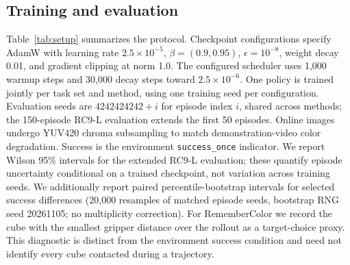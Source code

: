 \documentclass{IJCAS}
\begin{document}
\subsection{Training and evaluation}
\begin{table}[!t]
\caption{Protocol for the main Long-task experiments. Short-task differences are specified in their table captions.}
\label{tab:setup}
\begin{center}
{\footnotesize
{}
}
\end{center}
\end{table}
Table~\ref{tab:setup} summarizes the protocol. Checkpoint configurations specify AdamW with learning rate $2.5\times10^{-5}$, $\beta=(0.9,0.95)$, $\epsilon=10^{-8}$, weight decay 0.01, and gradient clipping at norm 1.0. The configured scheduler uses 1,000 warmup steps and 30,000 decay steps toward $2.5\times10^{-6}$. One policy is trained jointly per task set and method, using one training seed per configuration. Evaluation seeds are $4242424242+i$ for episode index $i$, shared across methods; the 150-episode RC9-L evaluation extends the first 50 episodes. Online images undergo YUV420 chroma subsampling to match demonstration-video color degradation. Success is the environment \texttt{success\_once} indicator. We report Wilson 95\% intervals for the extended RC9-L evaluation; these quantify episode uncertainty conditional on a trained checkpoint, not variation across training seeds. We additionally report paired percentile-bootstrap intervals for selected success differences (20,000 resamples of matched episode seeds, bootstrap RNG seed 20261105; no multiplicity correction). For RememberColor we record the cube with the smallest gripper distance over the rollout as a target-choice proxy. This diagnostic is distinct from the environment success condition and need not identify every cube contacted during a trajectory.
\end{document}
